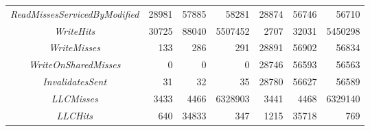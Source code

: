 \begin{table}[h]
\begin{adjustwidth}{-2cm}{-2cm}
\begin{center}
\begin{tabular}{| c | r r r | r r r|}
				\textit{ReadMissesServicedByModified} & 28981 & 57885 & 58281 & 28874 & 56746 & 56710 \\ 
				\textit{WriteHits} & 30725 & 88040 & 5507452 & 2707 & 32031 & 5450298 \\
				\textit{WriteMisses} & 133 & 286 & 291 & 28891 & 56902 & 56834 \\
				\textit{WriteOnSharedMisses} & 0 & 0 & 0 & 28746 & 56593 & 56563 \\
				\textit{InvalidatesSent} & 31 & 32 & 35 & 28780 & 56627 & 56589 \\
				\textit{LLCMisses} & 3433 & 4466 & 6328903 & 3441 & 4468 & 6329140 \\
				\textit{LLCHits} & 640 & 34833 & 347 & 1215 & 35718 & 769\\
				\hline
			\end{tabular}
		\end{center}
	\end{adjustwidth}
\end{table}